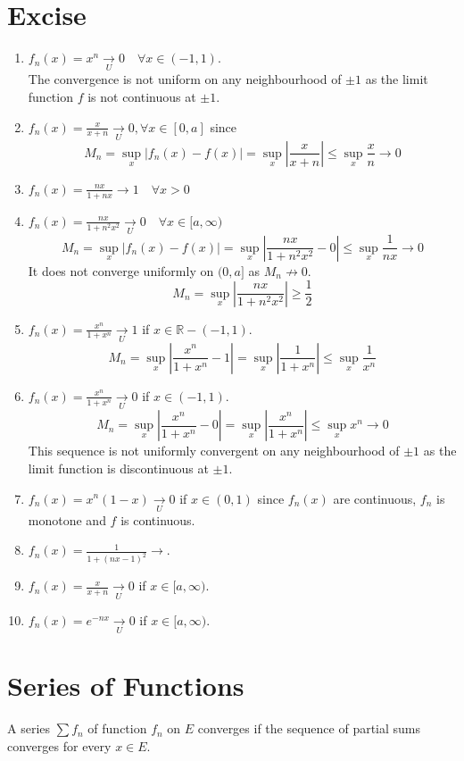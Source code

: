\section{Excise}
\begin{enumerate}
	\item $f_n(x) = x^n \underset{U}{\to} 0 \quad \forall x \in (-1,1)$.\\
	The convergence is not uniform on any neighbourhood of $\pm 1$ as the limit function $f$ is not continuous at $\pm 1$.
	\item $f_n(x) = \frac{x}{x+n} \underset{U}{\to} 0,\forall x \in [0,a]$ since
	$$M_n = \sup_x |f_n(x) - f(x)| = \sup_x \left|\frac{x}{x+n}\right| \le \sup_x \frac{x}{n} \to 0$$
	\item $f_n(x) = \frac{nx}{1+nx} \to 1 \quad \forall x > 0$
	\item $f_n(x) = \frac{nx}{1+n^2x^2} \underset{U}{\to} 0 \quad \forall x \in [a,\infty)$ 
	$$M_n = \sup_x |f_n(x) - f(x)| = \sup_x \left|\frac{nx}{1+n^2x^2} - 0\right| \le \sup_x \frac{1}{nx} \to 0$$
	It does not converge uniformly on $(0,a]$ as $M_n \not\to 0$.
	$$M_n = \sup_x |\frac{nx}{1+n^2x^2}| \ge \frac{1}{2}$$
	\item $f_n(x) = \frac{x^n}{1+x^n} \underset{U}{\to} 1$ if $x \in \mathbb{R} - (-1,1)$.
	$$M_n = \sup_x \left|\frac{x^n}{1+x^n} - 1\right| = \sup_x \left|\frac{1}{1+x^n}\right| \le \sup_x \frac{1}{x^n}$$
	\item $f_n(x) = \frac{x^n}{1+x^n} \underset{U}{\to} 0$ if $x \in (-1,1)$.
		$$M_n = \sup_x \left|\frac{x^n}{1+x^n} - 0\right| = \sup_x \left|\frac{x^n}{1+x^n}\right| \le \sup_x x^n \to 0$$
	This sequence is not uniformly convergent on any neighbourhood of $\pm 1$ as the limit function is discontinuous at $\pm 1$.
	\item $f_n(x) = x^n(1-x) \underset{U}{\to} 0$ if $x \in (0,1)$ since $f_n(x)$ are continuous, $f_n$ is monotone and $f$ is continuous.
	\item $f_n(x) = \frac{1}{1+(nx-1)^2} \to $.
	\item $f_n(x) = \frac{x}{x+n} \underset{U}{\to} 0$ if $x \in [a,\infty)$.
	\item $f_n(x) = e^{-nx} \underset{U}{\to} 0$ if $x \in [a,\infty)$.
\end{enumerate}

\section{Series of Functions}
\begin{definition}
	A series $\sum f_n$ of function $f_n$ on $E$ converges if the sequence of partial sums converges for every $x \in E$.
\end{definition}

